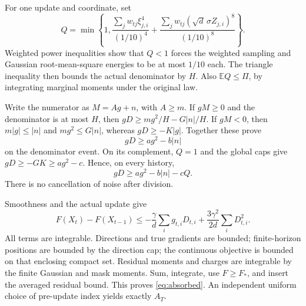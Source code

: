 \documentclass[11pt]{article}
\newcommand{\E}{\mathbb E}
\begin{document}
For one update and coordinate, set
\[
 Q=\min\left\{1,\frac{\sum_jw_{tj}\xi_{j,i}^4}{(1/10)^4}
                  +\frac{\sum_jw_{tj}(\sqrt d\,\sigma Z_{j,i})^8}{(1/10)^8}
           \right\}.
\]
Weighted power inequalities show that $Q<1$ forces the weighted sampling
and Gaussian root-mean-square energies to be at most $1/10$ each.
The triangle inequality then bounds the actual denominator by $H$.
Also $\E Q\le\Pi$, by integrating marginal moments under the original law.

Write the numerator as $M=Ag+n$, with $A\ge m$.
If $gM\ge0$ and the denominator is at most $H$, then
$gD\ge mg^2/H-G|n|/H$.
If $gM<0$, then $m|g|\le|n|$ and $mg^2\le G|n|$, whereas
$gD\ge-K|g|$. Together these prove
\[
 gD\ge ag^2-b|n|
\]
on the denominator event. On its complement, $Q=1$ and the global caps give
$gD\ge-GK\ge ag^2-c$. Hence, on every history,
\[
 gD\ge ag^2-b|n|-cQ.
\]
There is no cancellation of noise after division.

Smoothness and the actual update give
\[
 F(X_t)-F(X_{t-1})
 \le-\frac{\gamma}{d}\sum_i g_{t,i}D_{t,i}
          +\frac{3\gamma^2}{2d}\sum_iD_{t,i}^2.
\]
All terms are integrable. Directions and true gradients are bounded;
finite-horizon positions are bounded by the direction cap; the continuous
objective is bounded on that enclosing compact set. Residual moments and
charges are integrable by the finite Gaussian and mask moments.
Sum, integrate, use $F\ge F_*$, and insert the averaged residual bound.
This proves \eqref{eq:absorbed}. An independent uniform choice of pre-update
index yields exactly $A_T$.
\end{document}
